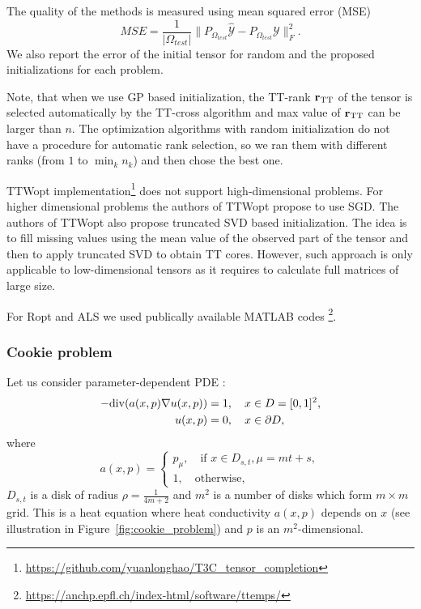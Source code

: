 The quality of the methods is measured using mean squared error (MSE)
\[
    MSE = \frac{1}{|\Omega_{test}|}\|P_{\Omega_{test}} \widehat{\mathcal{Y}} - P_{\Omega_{test}}\mathcal{Y} \|_F^2.
\]
We also report the error of the initial tensor for random and the proposed initializations for each problem.

Note, that when we use GP based initialization, the TT-rank
$\mathbf{r}_{{\rm TT}}$ of the tensor is selected automatically by the TT-cross algorithm and max value of $\mathbf{r}_{{\rm TT}}$ can be larger than $n$.
The optimization algorithms with random initialization do not have a procedure for automatic rank selection, so we ran them with different ranks (from $1$ to $\min_{k}{n_k}$) and then chose the best one.

TTWopt implementation\footnote{\url{https://github.com/yuanlonghao/T3C_tensor_completion}} does not support high-dimensional problems.
For higher dimensional problems the authors of TTWopt propose to use SGD.
The authors of TTWopt also propose truncated SVD based initialization.
The idea is to fill missing values using the mean value of the
observed part of the tensor and then to apply truncated SVD
to obtain TT cores.
However, such approach is only applicable to low-dimensional
tensors as it requires to calculate full matrices of large
size.

For Ropt and ALS we used publically available MATLAB codes
\footnote{\url{https://anchp.epfl.ch/index-html/software/ttemps/}}.


\subsubsection{Cookie problem}
\label{sec:cookie_problem}
Let us consider parameter-dependent PDE
\citep{ballani2015hierarchical, tobler2012low}:
\begin{align*}
    -{\rm div} (a(x, p) \nabla u(x, p)) &= 1, \quad x \in D = [0, 1]^2, \\
    u(x, p) &= 0, \quad x \in \partial D,
\end{align*}
where
\[
a(x, p) = \begin{cases}
p_\mu, \quad \mbox{if } x\in D_{s, t}, \mu = mt + s, \\
1, \quad \mbox{otherwise},
\end{cases}
\]
$D_{s, t}$ is a disk of radius $\rho=\frac{1}{4m + 2}$
and $m^2$ is a number of disks which form $m \times m$ grid.
This is a heat equation where heat conductivity $a(x, p)$ depends on $x$
(see illustration in Figure~\ref{fig:cookie_problem}) and $p$ is an $m^2$-dimensional.

